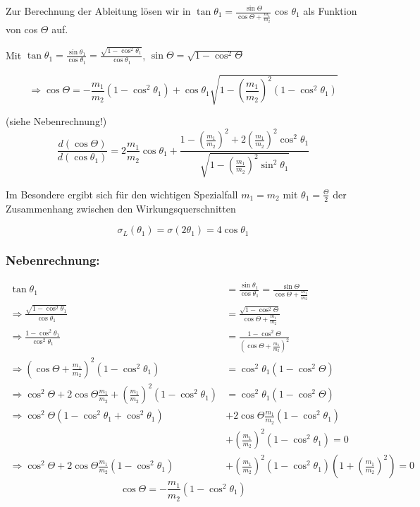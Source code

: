 \documentclass[10pt, letterpaper]{article}
\begin{document}
Zur Berechnung der Ableitung lösen wir in $\tan \theta_1 = \frac{\sin \Theta}{\cos \Theta + \frac{m_1}{m_2}}$ cos $\theta_1$ als Funktion von cos $\Theta$ auf.

Mit $\tan \theta_1 = \frac{\sin \theta_1}{\cos \theta_1} = \frac{\sqrt{1-\cos^2\theta_1}}{\cos \theta_1}$, $\sin \Theta = \sqrt{1-\cos^2\Theta}$

\[\Rightarrow \cos \Theta = -\frac{m_1}{m_2}(1-\cos^2\theta_1) + \cos \theta_1 \sqrt{1-(\frac{m_1}{m_2})^2(1-\cos^2\theta_1)}\]

(siehe Nebenrechnung!)
\[\frac{d(\cos\Theta)}{d(\cos\theta_1)} = 2\frac{m_1}{m_2}\cos\theta_1 + \frac{1-(\frac{m_1}{m_2})^2+2(\frac{m_1}{m_2})^2\cos^2\theta_1}{\sqrt{1-(\frac{m_1}{m_2})^2\sin^2\theta_1}}\]

Im Besondere ergibt sich für den wichtigen Spezialfall $m_1=m_2$ mit $\theta_1=\frac{\Theta}{2}$ der Zusammenhang zwischen den Wirkungsquerschnitten

\[\sigma_L(\theta_1)=\sigma(2\theta_1)=4\cos\theta_1\]


\subsubsection{Nebenrechnung:}

\begin{align*}
\tan\theta_1 &= \frac{\sin\theta_1}{\cos\theta_1} = \frac{\sin\Theta}{\cos\Theta + \frac{m_1}{m_2}} \\[2ex]
\Rightarrow \frac{\sqrt{1-\cos^2\theta_1}}{\cos\theta_1} &= \frac{\sqrt{1-\cos^2\Theta}}{\cos\Theta + \frac{m_1}{m_2}} \\[2ex]
\Rightarrow \frac{1-\cos^2\theta_1}{\cos^2\theta_1} &= \frac{1-\cos^2\Theta}{(\cos\Theta + \frac{m_1}{m_2})^2} \\[2ex]
\Rightarrow (\cos\Theta + \frac{m_1}{m_2})^2(1-\cos^2\theta_1) &= \cos^2\theta_1(1-\cos^2\Theta) \\[2ex]
\Rightarrow \cos^2\Theta + 2\cos\Theta\frac{m_1}{m_2} + (\frac{m_1}{m_2})^2(1-\cos^2\theta_1) &= \cos^2\theta_1(1-\cos^2\Theta) \\[2ex]
\Rightarrow \cos^2\Theta(1-\cos^2\theta_1 + \cos^2\theta_1) &+ 2\cos\Theta\frac{m_1}{m_2}(1-\cos^2\theta_1) \\
&+ (\frac{m_1}{m_2})^2(1-\cos^2\theta_1) = 0 \\[2ex]
\Rightarrow \cos^2\Theta + 2\cos\Theta\frac{m_1}{m_2}(1-\cos^2\theta_1) &+ (\frac{m_1}{m_2})^2(1-\cos^2\theta_1)(1+(\frac{m_1}{m_2})^2) = 0
\end{align*}
\[\cos\Theta = -\frac{m_1}{m_2}(1-\cos^2\theta_1)\]
\end{document}
